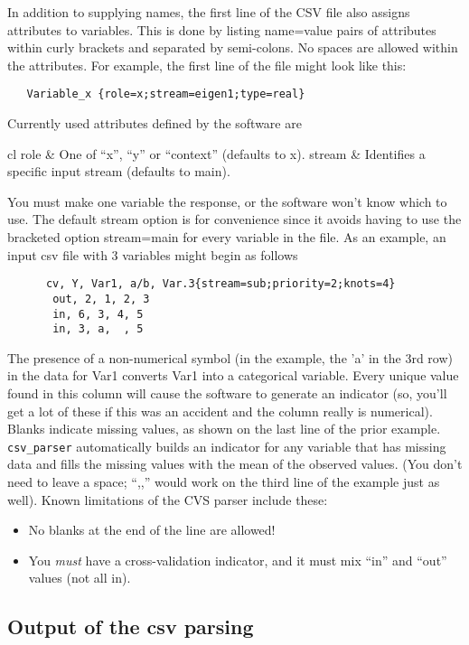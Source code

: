 \documentclass[12pt]{article}
\begin{document}
 In addition to supplying names, the first line of the CSV file also assigns
 attributes to variables.  This is done by listing name=value pairs of
 attributes within curly brackets and separated by semi-colons.  No spaces are
 allowed within the attributes.  For example, the first line of the file might
 look like this:
 \begin{verbatim}
   Variable_x {role=x;stream=eigen1;type=real}
 \end{verbatim}
 Currently used attributes defined by the software are

 \begin{tabular}{cl}
   role   &  One of ``x'', ``y'' or ``context'' (defaults to x).     \cr
   stream &  Identifies a specific input stream  (defaults to main). \cr
 \end{tabular}

 \noindent
 You must make one variable the response, or the software won't know which to
 use.  The default stream option is for convenience since it avoids having to
 use the bracketed option {stream=main} for every variable in the file.
 As an example, an input csv file with 3 variables might begin as follows
 \begin{verbatim}
      cv, Y, Var1, a/b, Var.3{stream=sub;priority=2;knots=4}
       out, 2, 1, 2, 3
       in, 6, 3, 4, 5
       in, 3, a,  , 5
 \end{verbatim}
 The presence of a non-numerical symbol (in the example, the 'a' in the 3rd row)
 in the data for Var1 converts Var1 into a categorical variable. Every unique
 value found in this column will cause the software to generate an indicator
 (so, you'll get a lot of these if this was an accident and the column really is
 numerical).  Blanks indicate missing values, as shown on the last line of the
 prior example.  {\tt csv\_parser} automatically builds an indicator for any
 variable that has missing data and fills the missing values with the mean of
 the observed values.  (You don't need to leave a space; ``,,'' would work on
 the third line of the example just as well).  Known limitations of the CVS
 parser include these:
 \begin{itemize}
   \item No blanks at the end of the line are allowed!
   \item You {\em must} have a cross-validation indicator, and it must mix
 ``in'' and ``out'' values (not all in).
 \end{itemize}


\subsection*{Output of the csv parsing}
\end{document}
